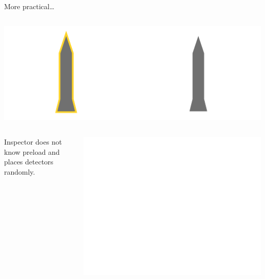 \documentclass[presentation]{beamer}
\begin{document}
\begin{frame}[label=sec-5-5]{More practical\ldots{}}
\begin{columns}
\begin{column}{0.48\textwidth}

\includegraphics[width=\textwidth]{images/zkp/measurement_step2.pdf}
\vspace{1cm}

\begin{columns}
\begin{column}{0.48\textwidth}
\footnotesize Inspector does not know preload and places detectors randomly. \normalsize
\end{column}

\begin{column}{0.48\textwidth}

\includegraphics[width=\textwidth]{images/zkp/measurement_detectors_inspector.pdf}
\end{column}
\end{columns}
\end{column}
\end{columns}
\end{frame}
\end{document}
